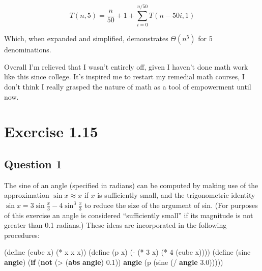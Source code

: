 \documentclass[
]{article}
\newenvironment{Shaded}{}{}
\newcommand{\DecValTok}[1]{\textcolor[rgb]{0.25,0.63,0.44}{#1}}
\newcommand{\ExtensionTok}[1]{#1}
\newcommand{\FloatTok}[1]{\textcolor[rgb]{0.25,0.63,0.44}{#1}}
\newcommand{\FunctionTok}[1]{\textcolor[rgb]{0.02,0.16,0.49}{#1}}
\newcommand{\KeywordTok}[1]{\textcolor[rgb]{0.00,0.44,0.13}{\textbf{#1}}}
\newcommand{\NormalTok}[1]{#1}
\newcommand{\OperatorTok}[1]{\textcolor[rgb]{0.40,0.40,0.40}{#1}}
\begin{document}
\[
T(n,5)=\frac n{50}+1+\sum_{i=0}^{n/50}T(n-50i,1)
\]

Which, when expanded and simplified, demonstrates \(\Theta(n^{5})\) for
5 denominations.

Overall I'm relieved that I wasn't entirely off, given I haven't done
math work like this since college. It's inspired me to restart my
remedial math courses, I don't think I really grasped the nature of math
as a tool of empowerment until now.

\hypertarget{exercise-1.15}{%
\section{Exercise 1.15}\label{exercise-1.15}}

\hypertarget{question-1-1}{%
\subsection{Question 1}\label{question-1-1}}

The sine of an angle (specified in radians) can be computed by making
use of the approximation \(\sin x ≈ x\) if \(x\) is sufficiently small,
and the trigonometric identity
\(\sin x = 3\sin\frac{x}{3} − 4\sin^3\frac{x}{3}\) to reduce the size of
the argument of sin. (For purposes of this exercise an angle is
considered ``sufficiently small'' if its magnitude is not greater than
0.1 radians.) These ideas are incorporated in the following procedures:

\hypertarget{1-15-deps}{%
\label{1-15-deps}}%
\begin{Shaded}
\begin{Highlighting}[numbers=left,,]
\NormalTok{(}\ExtensionTok{define}\FunctionTok{ }\NormalTok{(cube x) (}\OperatorTok{*}\NormalTok{ x x x))}
\NormalTok{(}\ExtensionTok{define}\FunctionTok{ }\NormalTok{(p x) (}\OperatorTok{{-}}\NormalTok{ (}\OperatorTok{*} \DecValTok{3}\NormalTok{ x) (}\OperatorTok{*} \DecValTok{4}\NormalTok{ (cube x))))}
\NormalTok{(}\ExtensionTok{define}\FunctionTok{ }\NormalTok{(sine }\KeywordTok{angle}\NormalTok{)}
\NormalTok{  (}\KeywordTok{if}\NormalTok{ (}\KeywordTok{not}\NormalTok{ (}\OperatorTok{\textgreater{}}\NormalTok{ (}\KeywordTok{abs} \KeywordTok{angle}\NormalTok{) }\FloatTok{0.1}\NormalTok{))}
      \KeywordTok{angle}
\NormalTok{      (p (sine (}\OperatorTok{/} \KeywordTok{angle} \FloatTok{3.0}\NormalTok{)))))}
\end{Highlighting}
\end{Shaded}
\end{document}
